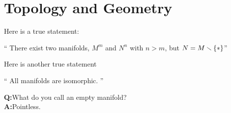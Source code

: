 \setcounter{section}{0}

\section{Topology and Geometry}
Here is a true statement:
\begin{center}
  \enquote{
  There exist two manifolds, $M^m$ and $N^n$ with $n>m$, 
  but $N = M\smallsetminus \{\ast\}$}
\end{center}
Here is another true statement
\begin{center}
  \enquote{
  All manifolds are isomorphic.
  }
\end{center}

\textbf{Q:}What do you call an empty manifold?\\
\textbf{A:}Pointless.
